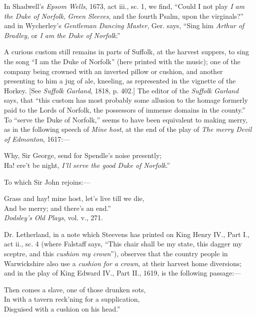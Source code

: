 In Shadwell’s \textit{Epsom Wells}, 1673, act iii., sc. 1, we find, “Could I not play
\textit{I am the Duke of Norfolk}, \textit{Green Sleeves}, and the fourth Psalm, upon the
virginals?” and in Wycherley’s \textit{Gentleman Dancing Master}, Ger. says, “Sing
him \textit{Arthur of Bradley}, or \textit{I am the Duke of Norfolk}.”

A curious custom still remains in parts of Suffolk, at the harvest suppers, to
sing the song “I am the Duke of Norfolk” (here printed with the music); one
of the company being crowned with an inverted pillow or cushion, and another
presenting to him a jug of ale, kneeling, as represented in the vignette of the
Horkey. [See \textit{Suffolk Garland}, 1818, p. 402.] The editor of the \textit{Suffolk
Garland} says, that “this custom has most probably some allusion to the homage
formerly paid to the Lords of Norfolk, the possessors of immense domains in the
county.” To “serve the Duke of Norfolk,” seems to have been equivalent to
making merry, as in the following speech of \textit{Mine host}, at the end of the play of
\textit{The merry Devil of Edmonton}, 1617:—

\pagebreak

\begin{scverse}
Why, Sir George, send for Spendle’s noise
 presently;\\
Ha! ere’t be night, \textit{I’ll serve the good Duke of Norfolk}.”
\end{scverse}
To which Sir John rejoins:—
\begin{scverse}
Grass and hay! mine host, let’s live till we die,\\
And be merry; and there’s an end.”\\
\vin\vin\vin\vin\vin\textit{Dodsley’s Old Plays}, vol. v., 271.
\end{scverse}

Dr. Letherland, in a note which Steevens has printed on King Henry IV.,
Part I., act ii., sc. 4 (where Falstaff says, “This chair shall be my state, this
dagger my sceptre, and this \textit{cushion my crown}”), observes that the country people
in Warwickshire also use a \textit{cushion for a crown}, at their harvest home diversions;
and in the play of King Edward IV., Part II., 1619, is the following passage:—
\settowidth{\versewidth}{Then comes a slave, one of those drunken sots,}
\begin{scverse}
Then comes a slave, one of those drunken sots,\\
In with a tavern reck’ning for a supplication,\\
Disguised with a cushion on his head.”
\end{scverse}

